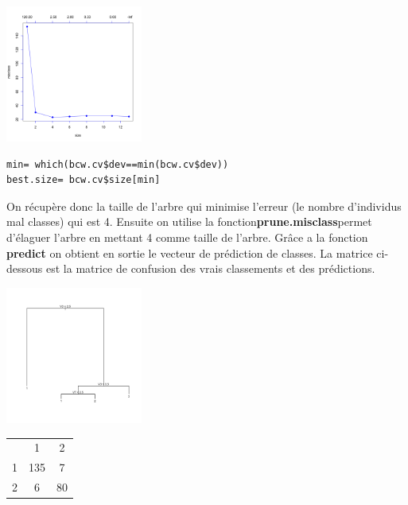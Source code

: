 \documentclass[10pt]{article}
\begin{document}
\begin{minipage}{.4\textwidth}
	\includegraphics[width=45mm]{Figures/bcw_cvplot.png}
\end{minipage}%
\hspace{0.01\linewidth}
\begin{minipage}{.65\textwidth}
 \begin{lstlisting}
min= which(bcw.cv$dev==min(bcw.cv$dev))
best.size= bcw.cv$size[min]
 \end{lstlisting}
\end{minipage}
On récupère donc la taille de l'arbre qui minimise l'erreur (le nombre d'individus mal classes) qui est 4. Ensuite on utilise la fonction\textbf{prune.misclass}permet d’élaguer l’arbre en mettant 4 comme taille de l'arbre. Grâce a la fonction \textbf{predict} on obtient en sortie le vecteur de prédiction de classes. La matrice ci-dessous est la matrice de confusion des vrais classements et des prédictions.
\begin{minipage}{.5\textwidth}
	\includegraphics[width=45mm]{Figures/bcw_prunedtree.png}
\end{minipage}%
\hspace{0.00\linewidth}
\begin{minipage}{.4\textwidth}
\begin{tabular}{c  c c}
  & 1  &  2 \\
1 & 135 &   7 \\
2 &  6&  80
\end{tabular}
\end{minipage}
\end{document}
